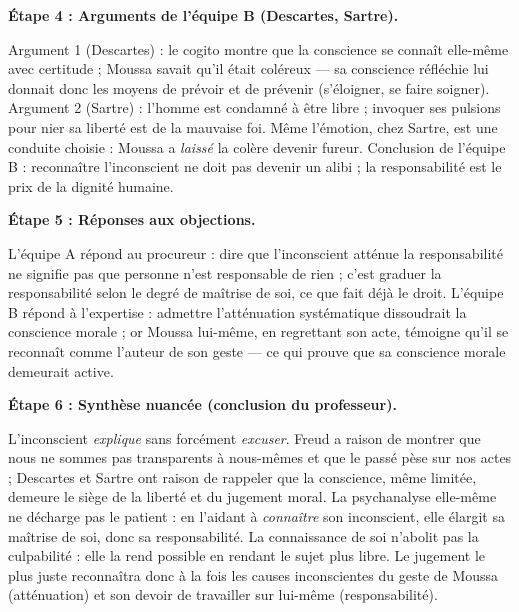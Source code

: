 \documentclass[11pt]{article}
\newcounter{popsec}
\newcounter{popsub}
\newcommand{\courssub}[1]{%
  \stepcounter{popsub}%
  \par\vspace{9pt}\noindent{\popxbold\fontsize{11.5}{13}\selectfont\color{popink}{\color{poporange}\thepopsec.\thepopsub}\hspace{6pt}#1}\par\nopagebreak\vspace{4pt}
}
\begin{document}
\begin{exoresolu}
\textbf{Étape 4 : Arguments de l'équipe B (Descartes, Sartre).}

Argument 1 (Descartes) : le cogito montre que la conscience se connaît elle-même avec certitude ; Moussa savait qu'il était coléreux — sa conscience réfléchie lui donnait donc les moyens de prévoir et de prévenir (s'éloigner, se faire soigner). Argument 2 (Sartre) : l'homme est \guillemotleft condamné à être libre \guillemotright ; invoquer ses pulsions pour nier sa liberté est de la mauvaise foi. Même l'émotion, chez Sartre, est une conduite choisie : Moussa a \emph{laissé} la colère devenir fureur. Conclusion de l'équipe B : reconnaître l'inconscient ne doit pas devenir un alibi ; la responsabilité est le prix de la dignité humaine.

\textbf{Étape 5 : Réponses aux objections.}

L'équipe A répond au procureur : dire que l'inconscient atténue la responsabilité ne signifie pas que \guillemotleft personne n'est responsable de rien \guillemotright ; c'est graduer la responsabilité selon le degré de maîtrise de soi, ce que fait déjà le droit. L'équipe B répond à l'expertise : admettre l'atténuation systématique dissoudrait la conscience morale ; or Moussa lui-même, en regrettant son acte, témoigne qu'il se reconnaît comme l'auteur de son geste — ce qui prouve que sa conscience morale demeurait active.

\textbf{Étape 6 : Synthèse nuancée (conclusion du professeur).}

L'inconscient \emph{explique} sans forcément \emph{excuser}. Freud a raison de montrer que nous ne sommes pas transparents à nous-mêmes et que le passé pèse sur nos actes ; Descartes et Sartre ont raison de rappeler que la conscience, même limitée, demeure le siège de la liberté et du jugement moral. La psychanalyse elle-même ne décharge pas le patient : en l'aidant à \emph{connaître} son inconscient, elle élargit sa maîtrise de soi, donc sa responsabilité. La connaissance de soi n'abolit pas la culpabilité : elle la rend possible en rendant le sujet plus libre. Le jugement le plus juste reconnaîtra donc à la fois les causes inconscientes du geste de Moussa (atténuation) et son devoir de travailler sur lui-même (responsabilité).
\end{exoresolu}

\courssub{Bilan de l'activité}
\end{document}

